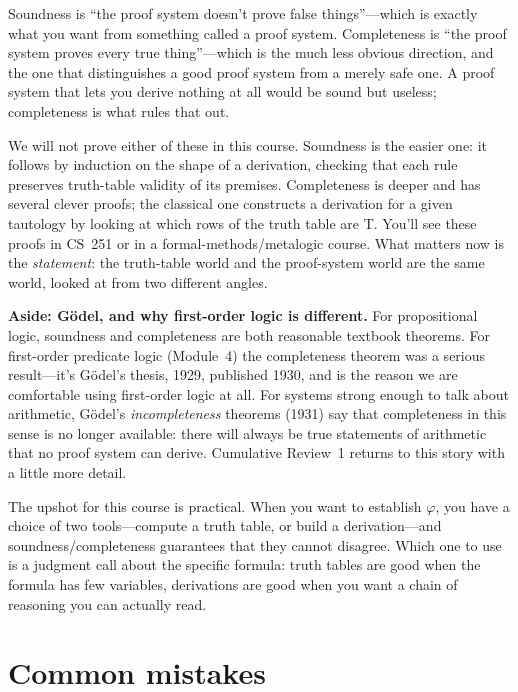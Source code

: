 \documentclass[11pt]{article}
\begin{document}
Soundness is ``the proof system doesn't prove false things''---which is exactly what you want from something called a proof system. Completeness is ``the proof system proves every true thing''---which is the much less obvious direction, and the one that distinguishes a good proof system from a merely safe one. A proof system that lets you derive nothing at all would be sound but useless; completeness is what rules that out.

We will not prove either of these in this course. Soundness is the easier one: it follows by induction on the shape of a derivation, checking that each rule preserves truth-table validity of its premises. Completeness is deeper and has several clever proofs; the classical one constructs a derivation for a given tautology by looking at which rows of the truth table are T. You'll see these proofs in CS~251 or in a formal-methods/metalogic course. What matters now is the \emph{statement}: the truth-table world and the proof-system world are the same world, looked at from two different angles.

\begin{mdframed}[linewidth=0.6pt, linecolor=gray!60, backgroundcolor=gray!4, innertopmargin=6pt, innerbottommargin=6pt, nobreak=true]
\textbf{Aside: G\"odel, and why first-order logic is different.} For propositional logic, soundness and completeness are both reasonable textbook theorems. For first-order predicate logic (Module~4) the completeness theorem was a serious result---it's G\"odel's thesis, 1929, published 1930, and is the reason we are comfortable using first-order logic at all. For systems strong enough to talk about arithmetic, G\"odel's \emph{incompleteness} theorems (1931) say that completeness in this sense is no longer available: there will always be true statements of arithmetic that no proof system can derive. Cumulative Review~1 returns to this story with a little more detail.
\end{mdframed}

The upshot for this course is practical. When you want to establish $\varphi$, you have a choice of two tools---compute a truth table, or build a derivation---and soundness/completeness guarantees that they cannot disagree. Which one to use is a judgment call about the specific formula: truth tables are good when the formula has few variables, derivations are good when you want a chain of reasoning you can actually read.

\section{Common mistakes}
\end{document}
